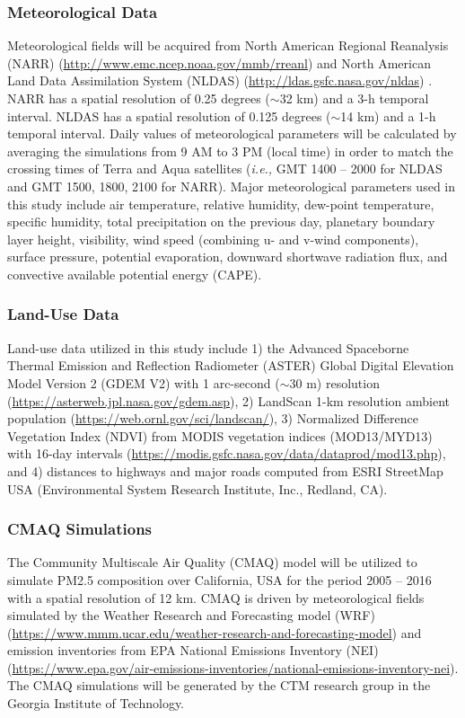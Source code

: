 \documentclass[11pt]{article}
\begin{document}
\subsubsection{Meteorological Data}
Meteorological fields will be acquired from North American Regional Reanalysis (NARR) (\url{http://www.emc.ncep.noaa.gov/mmb/rreanl}) \citep{Mesinger2006} and North American Land Data Assimilation System (NLDAS) (\url{http://ldas.gsfc.nasa.gov/nldas}) \citep{Mitchell2004}. NARR has a spatial resolution of 0.25 degrees ($\sim$32 km) and a 3-h temporal interval. NLDAS has a spatial resolution of 0.125 degrees ($\sim$14 km) and a 1-h temporal interval. Daily values of meteorological parameters will be calculated by averaging the simulations from 9 AM to 3 PM (local time) in order to match the crossing times of Terra and Aqua satellites (\textit{i.e.,} GMT 1400 -- 2000 for NLDAS and GMT 1500, 1800, 2100 for NARR). Major meteorological parameters used in this study include air temperature, relative humidity, dew-point temperature, specific humidity, total precipitation on the previous day, planetary boundary layer height, visibility, wind speed (combining u- and v-wind components), surface pressure, potential evaporation, downward shortwave radiation flux, and convective available potential energy (CAPE). 

\subsubsection{Land-Use Data}
Land-use data utilized in this study include 1) the Advanced Spaceborne Thermal Emission and Reflection Radiometer (ASTER) Global Digital Elevation Model Version 2 (GDEM V2) with 1 arc-second ($\sim$30 m) resolution (\url{https://asterweb.jpl.nasa.gov/gdem.asp}), 2) LandScan 1-km resolution ambient population (\url{https://web.ornl.gov/sci/landscan/}), 3) Normalized Difference Vegetation Index (NDVI) from MODIS vegetation indices (MOD13/MYD13) with 16-day intervals (\url{https://modis.gsfc.nasa.gov/data/dataprod/mod13.php}), and 4) distances to highways and major roads computed from ESRI StreetMap USA (Environmental System Research Institute, Inc., Redland, CA). 

\subsubsection{CMAQ Simulations}
The Community Multiscale Air Quality (CMAQ) model will be utilized to simulate PM2.5 composition over California, USA for the period 2005 -- 2016 with a spatial resolution of 12 km. CMAQ is driven by meteorological fields simulated by the Weather Research and Forecasting model (WRF) (\url{https://www.mmm.ucar.edu/weather-research-and-forecasting-model}) and emission inventories from EPA National Emissions Inventory (NEI) (\url{https://www.epa.gov/air-emissions-inventories/national-emissions-inventory-nei}). The CMAQ simulations will be generated by the CTM research group in the Georgia Institute of Technology. 
\end{document}

